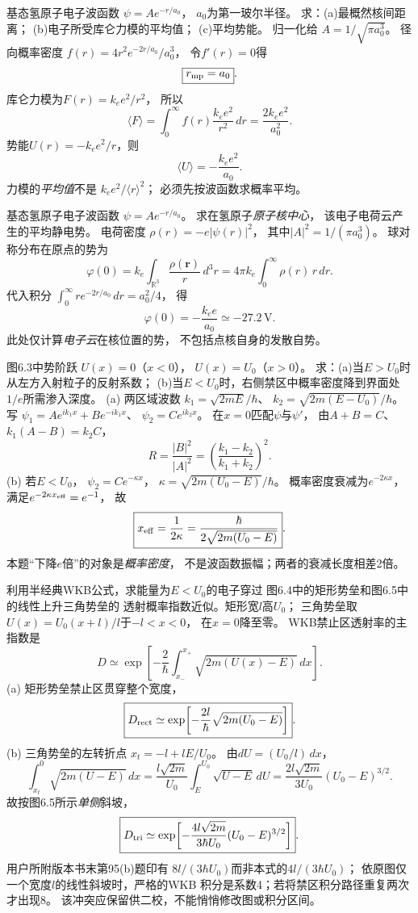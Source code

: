 基态氢原子电子波函数
$\psi=Ae^{-r/a_0}$，
$a_0$为第一玻尔半径。
求：(a)最概然核间距离；
(b)电子所受库仑力模的平均值；
(c)平均势能。
\exsolution
归一化给
$A=1/\sqrt{\pi a_0^3}$。
径向概率密度
$f(r)=4r^2e^{-2r/a_0}/a_0^3$，
令$f'(r)=0$得
\[
 \boxed{r_{\rm mp}=a_0}.
\]
库仑力模为$F(r)=k_ee^2/r^2$，
所以
\[
 \langle F\rangle=
 \int_0^\infty f(r)\frac{k_ee^2}{r^2}\,dr
 =\boxed{\frac{2k_ee^2}{a_0^2}}.
\]
势能$U(r)=-k_ee^2/r$，则
\[
 \boxed{\langle U\rangle=
 -\frac{k_ee^2}{a_0}}.
\]
\excheck 力模的\emph{平均值}不是
$k_ee^2/\langle r\rangle^2$；
必须先按波函数求概率平均。

基态氢原子电子波函数
$\psi=Ae^{-r/a_0}$。
求在氢原子\emph{原子核中心}，
该电子电荷云产生的平均静电势。
\exsolution
电荷密度
$\rho(r)=-e|\psi(r)|^2$，
其中$|A|^2=1/(\pi a_0^3)$。
球对称分布在原点的势为
\[
 \varphi(0)=k_e\int_{\mathbb R^3}
 \frac{\rho(\boldsymbol r)}r\,d^3r
 =4\pi k_e\int_0^\infty \rho(r)\,r\,dr.
\]
代入积分
$\int_0^\infty r e^{-2r/a_0}\,dr=a_0^2/4$，
得
\[
 \boxed{\varphi(0)=-\frac{k_ee}{a_0}
 \simeq-27.2\,\mathrm V}.
\]
\excheck 此处仅计算\emph{电子云}在核位置的势，
不包括点核自身的发散自势。

图6.3中势阶跃
$U(x)=0$（$x<0$），
$U(x)=U_0$（$x>0$）。
求：(a)当$E>U_0$时从左方入射粒子的反射系数；
(b)当$E<U_0$时，右侧禁区中概率密度降到界面处
$1/e$所需渗入深度。
\exsolution
(a) 两区域波数
$k_1=\sqrt{2mE}/\hbar$、
$k_2=\sqrt{2m(E-U_0)}/\hbar$。
写
$\psi_1=Ae^{ik_1x}+Be^{-ik_1x}$、
$\psi_2=Ce^{ik_2x}$。
在$x=0$匹配$\psi$与$\psi'$，
由$A+B=C$、
$k_1(A-B)=k_2C$，
\[
 \boxed{R=\frac{|B|^2}{|A|^2}
 =\left(\frac{k_1-k_2}{k_1+k_2}\right)^2}.
\]
(b) 若$E<U_0$，
$\psi_2=C e^{-\kappa x}$，
$\kappa=\sqrt{2m(U_0-E)}/\hbar$。
概率密度衰减为$e^{-2\kappa x}$，
满足$e^{-2\kappa x_{\rm eff}}=e^{-1}$，
故
\[
 \boxed{x_{\rm eff}=\frac1{2\kappa}
 =\frac{\hbar}{2\sqrt{2m(U_0-E)}}}.
\]
\excheck 本题“下降$e$倍”的对象是\emph{概率密度}，
不是波函数振幅；两者的衰减长度相差2倍。

利用半经典WKB公式，求能量为$E<U_0$的电子穿过
图6.4中的矩形势垒和图6.5中的线性上升三角势垒的
透射概率指数近似。矩形宽$l$高$U_0$；
三角势垒取$U(x)=U_0(x+l)/l$于$-l<x<0$，
在$x=0$降至零。
\exsolution
WKB禁止区透射率的主指数是
\[
 D\simeq\exp\!\left[-\frac2\hbar
 \int_{x_-}^{x_+}\sqrt{2m(U(x)-E)}\,dx\right].
\]
(a) 矩形势垒禁止区贯穿整个宽度，
\[
 \boxed{D_{\rm rect}\simeq
 \exp\!\left[-\frac{2l}{\hbar}\sqrt{2m(U_0-E)}\right]}.
\]
(b) 三角势垒的左转折点
$x_t=-l+lE/U_0$。
由$dU=(U_0/l)\,dx$，
\[
 \int_{x_t}^{0}\sqrt{2m(U-E)}\,dx
 =\frac{l\sqrt{2m}}{U_0}
 \int_E^{U_0}\sqrt{U-E}\,dU
 =\frac{2l\sqrt{2m}}{3U_0}(U_0-E)^{3/2}.
\]
故按图6.5所示\emph{单侧}斜坡，
\[
 \boxed{D_{\rm tri}\simeq
 \exp\!\left[-\frac{4l\sqrt{2m}}{3\hbar U_0}
 (U_0-E)^{3/2}\right]}.
\]
\excheck 用户所附版本书末第95(b)题印有
$8l/(3\hbar U_0)$而非本式的$4l/(3\hbar U_0)$；
依原图仅一个宽度$l$的线性斜坡时，严格的WKB
积分是系数4；若将禁区积分路径重复两次才出现8。
该冲突应保留供二校，不能悄悄修改图或积分区间。

